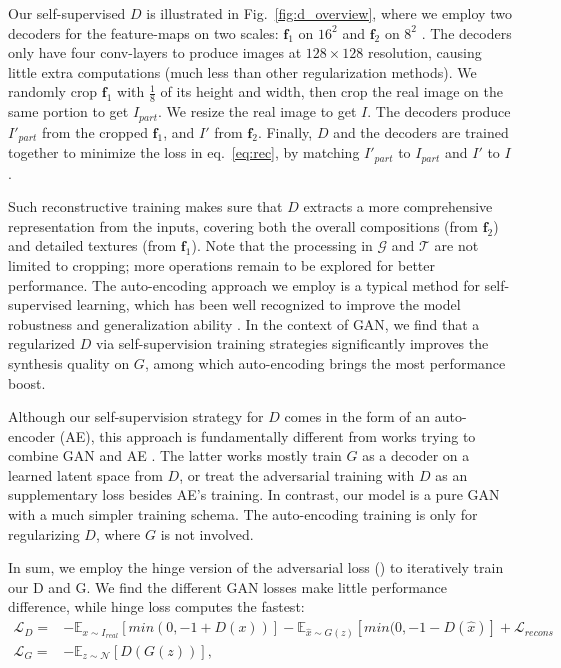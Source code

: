 \documentclass{article} \usepackage{iclr2021_conference,times}
\begin{document}
Our self-supervised $D$ is illustrated in Fig.~\ref{fig:d_overview}, where we employ two decoders for the feature-maps on two scales: $\mathbf{f}_1$ on $16^2$ and $\mathbf{f}_2$ on $8^2$ . The decoders only have four conv-layers to produce images at $128\times128$ resolution, causing little extra computations (much less than other regularization methods). We randomly crop $\mathbf{f}_1$ with $\frac{1}{8}$ of its height and width, then crop the real image on the same portion to get $I_{part}$. We resize the real image to get $I$. The decoders produce $I'_{part}$ from the cropped $\mathbf{f}_1$, and $I'$ from $\mathbf{f}_2$. Finally, $D$ and the decoders are trained together to minimize the loss in eq.~\ref{eq:rec}, by matching $I'_{part}$ to $I_{part}$ and $I'$ to $I$.

Such reconstructive training makes sure that $D$ extracts a more comprehensive representation from the inputs, covering both the overall compositions (from $\mathbf{f}_2$) and detailed textures (from $\mathbf{f}_1$). Note that the processing in $\mathcal{G}$ and $\mathcal{T}$ are not limited to cropping; more operations remain to be explored for better performance. The auto-encoding approach we employ is a typical method for self-supervised learning, which has been well recognized to improve the model robustness and generalization ability \citep{he2020momentum,hendrycks2019using,jing2020self,goyal2019scaling}. In the context of GAN, we find that a regularized $D$ via self-supervision training strategies significantly improves the synthesis quality on $G$, among which auto-encoding brings the most performance boost.

Although our self-supervision strategy for $D$ comes in the form of an auto-encoder (AE), this approach is fundamentally different from works trying to combine GAN and AE \citep{larsen2016autoencoding,guo2019auto,zhao2016energy,berthelot2017began}. The latter works mostly train $ G $ as a decoder on a learned latent space from $ D $, or treat the adversarial training with $ D $ as an supplementary loss besides AE's training. In contrast, our model is a pure GAN with a much simpler training schema. The auto-encoding training is only for regularizing $D$, where $G$ is not involved.




In sum, we employ the hinge version of the adversarial loss (\cite{lim2017geometric,tran2017deep}) to iteratively train our D and G. We find the different GAN losses make little performance difference, while hinge loss computes the fastest: 
\begin{align}
    \mathcal{L}_{D}= &-  \mathbb{E}_{ x \sim I_{real} } [ min(0, -1 + D(x)) ]  -\mathbb{E}_{ \hat{x} \sim G(z) }[ min(0, -1 - D(\hat{x}) ]
    + \mathcal{L}_{recons} \\
    \mathcal{L}_{G}= &-\mathbb{E}_{ z \sim \mathcal{N} }[ D( G(z) ) ] ,
\end{align}
\end{document}
